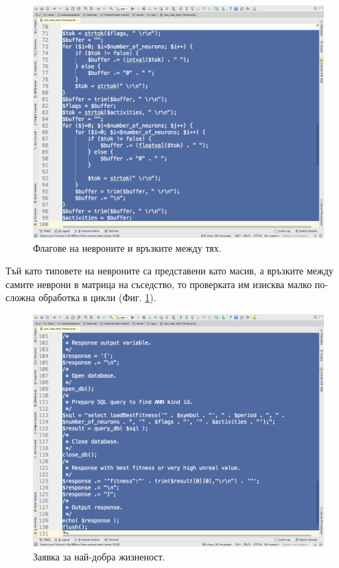\documentclass[book,14pt,oneside,openany]{memoir}
\begin{document}
\begin{figure}[h]
  \centering
  \includegraphics[height=0.45\pdfpageheight]{pic0123}
  \caption{Флагове на невроните и връзките между тях.}
\label{fig:pic0123}
\end{figure}
\FloatBarrier

Тъй като типовете на невроните са представени като масив, а връзките между самите неврони в матрица на съседство, то проверката им изисква малко по-сложна обработка в цикли (Фиг. \ref{fig:pic0123}).

\begin{figure}[h]
  \centering
  \includegraphics[height=0.45\pdfpageheight]{pic0124}
  \caption{Заявка за най-добра жизненост.}
\label{fig:pic0124}
\end{figure}
\FloatBarrier
\end{document}

